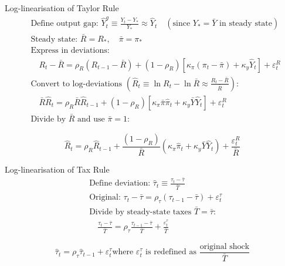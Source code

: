 \documentclass[11pt,preprint]{elsarticle}
\numberwithin{equation}{section}
\numberwithin{figure}{section}
\numberwithin{table}{section}
\begin{document}
Log-linearisation of Taylor Rule \begin{align*}
& \text{Define output gap: } \hat{Y}^g_t \equiv \frac{Y_t - Y_*}{Y_*} \approx \hat{Y}_t \quad (\text{since } Y_* = \bar{Y} \text{ in steady state}) \\[6pt]
& \text{Steady state: } \bar{R} = R_*, \quad \bar{\pi} = \pi_* \\[6pt]
& \text{Express in deviations:} \\
& \quad R_t - \bar{R} = \rho_R (R_{t-1} - \bar{R}) + (1 - \rho_R) \left[ \kappa_\pi (\pi_t - \bar{\pi}) + \kappa_y \hat{Y}_t \right] + \varepsilon_t^R \\[6pt]
& \text{Convert to log-deviations } (\hat{R}_t \equiv \ln R_t - \ln \bar{R} \approx \frac{R_t - \bar{R}}{\bar{R}}): \\
& \quad \bar{R} \hat{R}_t = \rho_R \bar{R} \hat{R}_{t-1} + (1 - \rho_R) \left[ \kappa_\pi \bar{\pi} \hat{\pi}_t + \kappa_y \bar{Y} \hat{Y}_t \right] + \varepsilon_t^R \\[6pt]
& \text{Divide by } \bar{R} \text{ and use } \bar{\pi} = 1:
\end{align*}

\begin{equation}\label{taylor_rule_linearised_app}
\boxed{\hat{R}_t = \rho_R \hat{R}_{t-1} + \frac{(1 - \rho_R)}{\bar{R}} \left( \kappa_\pi \hat{\pi}_t + \kappa_y \bar{Y} \hat{Y}_t \right) + \frac{\varepsilon_t^R}{\bar{R}}}
\end{equation}

Log-linearisation of Tax Rule \begin{align*}
& \text{Define deviation: } \hat{\tau}_t \equiv \frac{\tau_t - \bar{\tau}}{\bar{T}} \\[6pt]
& \text{Original: } \tau_t - \bar{\tau} = \rho_\tau (\tau_{t-1} - \bar{\tau}) + \varepsilon_t^\tau \\[6pt]
& \text{Divide by steady-state taxes } \bar{T} = \bar{\tau}: \\
& \quad \frac{\tau_t - \bar{\tau}}{\bar{T}} = \rho_\tau \frac{\tau_{t-1} - \bar{\tau}}{\bar{T}} + \frac{\varepsilon_t^\tau}{\bar{T}}
\end{align*}

\begin{equation}\label{real_taxes_linearised_app}
\boxed{\hat{\tau}_t = \rho_\tau \hat{\tau}_{t-1} + \varepsilon_t^\tau}
\text{where } \varepsilon_t^\tau \text{ is redefined as } \frac{\text{original shock}}{\bar{T}}
\end{equation}
\end{document}
